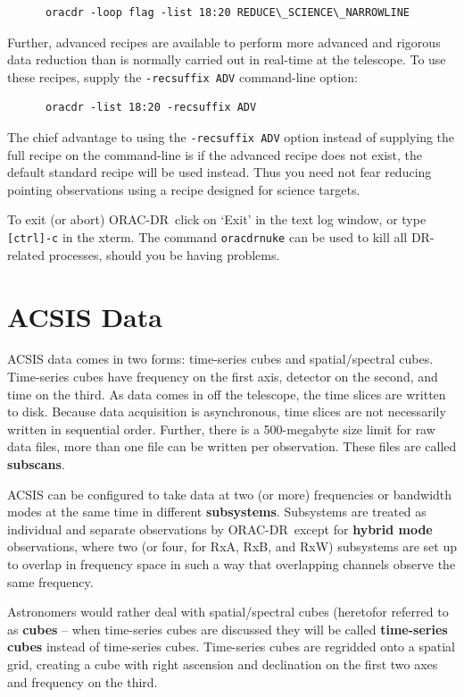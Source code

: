 \documentclass[twoside,11pt]{article}
\renewcommand{\_}{\texttt{\symbol{95}}}
\newcommand{\ORACDR}{{\footnotesize ORAC-DR}}
\begin{document}
\begin{verbatim}
      oracdr -loop flag -list 18:20 REDUCE\_SCIENCE\_NARROWLINE
\end{verbatim}

Further, advanced recipes are available to perform more advanced and rigorous
data reduction than is normally carried out in real-time at the telescope. To
use these recipes, supply the {\tt -recsuffix ADV} command-line option:

\begin{verbatim}
      oracdr -list 18:20 -recsuffix ADV
\end{verbatim}

The chief advantage to using the {\tt -recsuffix ADV} option instead of
supplying the full recipe on the command-line is if the advanced recipe does
not exist, the default standard recipe will be used instead. Thus you need not
fear reducing pointing observations using a recipe designed for science
targets.

To exit (or abort) \ORACDR\ click on `Exit' in the text log window, or
type {\tt [ctrl]-c} in the xterm. The command {\tt oracdr\_nuke} can
be used to kill all DR-related processes, should you be having
problems.

\section{ACSIS Data}

ACSIS data comes in two forms: time-series cubes and spatial/spectral
cubes. Time-series cubes have frequency on the first axis, detector on the
second, and time on the third. As data comes in off the telescope, the time
slices are written to disk. Because data acquisition is asynchronous, time
slices are not necessarily written in sequential order. Further, there is a
500-megabyte size limit for raw data files, more than one file can be written
per observation. These files are called {\bf subscans}.

ACSIS can be configured to take data at two (or more) frequencies or bandwidth
modes at the same time in different {\bf subsystems}. Subsystems are treated
as individual and separate observations by \ORACDR\, except for {\bf hybrid
mode} observations, where two (or four, for RxA, RxB, and RxW) subsystems are
set up to overlap in frequency space in such a way that overlapping channels
observe the same frequency.

Astronomers would rather deal with spatial/spectral cubes (heretofor referred
to as {\bf cubes} -- when time-series cubes are discussed they will be called
{\bf time-series cubes} instead of time-series cubes. Time-series cubes are
regridded onto a spatial grid, creating a cube with right ascension and
declination on the first two axes and frequency on the third.
\end{document}
